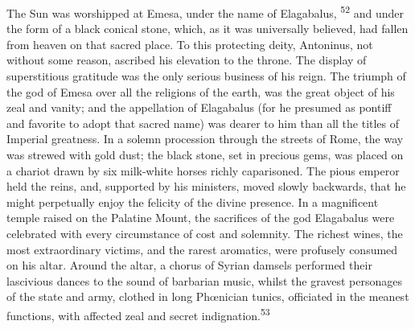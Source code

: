 
The Sun was worshipped at Emesa, under the name of Elagabalus, \textsuperscript{52}
and under the form of a black conical stone, which, as it was
universally believed, had fallen from heaven on that sacred
place. To this protecting deity, Antoninus, not without some
reason, ascribed his elevation to the throne. The display of
superstitious gratitude was the only serious business of his
reign. The triumph of the god of Emesa over all the religions of
the earth, was the great object of his zeal and vanity; and the
appellation of Elagabalus (for he presumed as pontiff and
favorite to adopt that sacred name) was dearer to him than all
the titles of Imperial greatness. In a solemn procession through
the streets of Rome, the way was strewed with gold dust; the
black stone, set in precious gems, was placed on a chariot drawn
by six milk-white horses richly caparisoned. The pious emperor
held the reins, and, supported by his ministers, moved slowly
backwards, that he might perpetually enjoy the felicity of the
divine presence. In a magnificent temple raised on the Palatine
Mount, the sacrifices of the god Elagabalus were celebrated with
every circumstance of cost and solemnity. The richest wines, the
most extraordinary victims, and the rarest aromatics, were
profusely consumed on his altar. Around the altar, a chorus of
Syrian damsels performed their lascivious dances to the sound of
barbarian music, whilst the gravest personages of the state and
army, clothed in long Phœnician tunics, officiated in the meanest
functions, with affected zeal and secret indignation.\textsuperscript{53}


